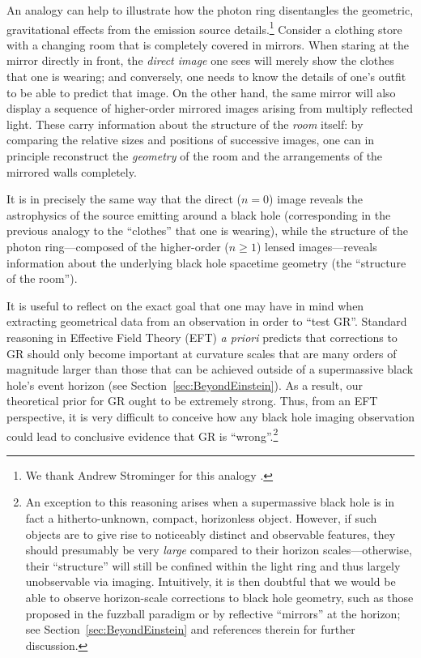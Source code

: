 \documentclass[graybox,envcountchap]{svmult}
\begin{document}
An analogy can help to illustrate how the photon ring disentangles the geometric, gravitational effects from the emission source details.\footnote{We thank Andrew Strominger for this analogy \cite{Podcast}.}
Consider a clothing store with a changing room that is completely covered in mirrors.
When staring at the mirror directly in front, the \emph{direct image} one sees will merely show the clothes that one is wearing; and conversely, one needs to know the details of one's outfit to be able to predict that image.
On the other hand, the same mirror will also display a sequence of higher-order mirrored images arising from multiply reflected light.
These carry information about the structure of the \emph{room} itself: by comparing the relative sizes and positions of successive images, one can in principle reconstruct the \emph{geometry} of the room and the arrangements of the mirrored walls completely. 

It is in precisely the same way that the direct ($n=0$) image reveals the astrophysics of the source emitting around a black hole (corresponding in the previous analogy to the ``clothes'' that one is wearing), while the structure of the photon ring---composed of the higher-order ($n\geq 1$) lensed images---reveals information about the underlying black hole spacetime geometry (the ``structure of the room'').

\bigskip

It is useful to reflect on the exact goal that one may have in mind when extracting geometrical data from an observation in order to ``test GR''.
Standard reasoning in Effective Field Theory (EFT) \emph{a priori} predicts that corrections to GR should only become important at curvature scales that are many orders of magnitude larger than those that can be achieved outside of a supermassive black hole's event horizon (see Section~\ref{sec:BeyondEinstein}).
As a result, our theoretical prior for GR ought to be extremely strong.
Thus, from an EFT perspective, it is very difficult to conceive how any black hole imaging observation could lead to conclusive evidence that GR is ``wrong''.\footnote{An exception to this reasoning arises when a supermassive black hole is in fact a hitherto-unknown, compact, horizonless object.
However, if such objects are to give rise to noticeably distinct and observable features, they should presumably be very \emph{large} compared to their horizon scales---otherwise, their ``structure'' will still be confined within the light ring and thus largely unobservable via imaging.
Intuitively, it is then doubtful that we would be able to observe horizon-scale corrections to black hole geometry, such as those proposed in the fuzzball paradigm or by reflective ``mirrors'' at the horizon; see Section~\ref{sec:BeyondEinstein} and references therein for further discussion.} 
\end{document}
